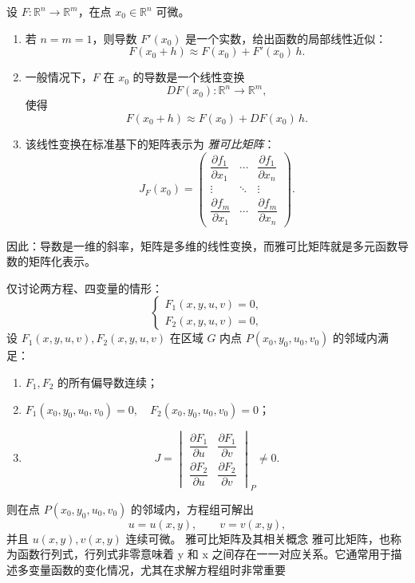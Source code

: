 \documentclass[lang=cn,10pt]{elegantbook}
\begin{document}
\begin{proposition}[导数、矩阵与雅可比矩阵的关系]
设 $F:\mathbb{R}^n \to \mathbb{R}^m$，在点 $x_0 \in \mathbb{R}^n$ 可微。

\begin{enumerate}
    \item 若 $n=m=1$，则导数 $F'(x_0)$ 是一个实数，给出函数的局部线性近似：
    \[
    F(x_0+h) \approx F(x_0) + F'(x_0)\,h.
    \]

    \item 一般情况下，$F$ 在 $x_0$ 的导数是一个线性变换
    \[
    DF(x_0):\mathbb{R}^n \to \mathbb{R}^m,
    \]
    使得
    \[
    F(x_0+h) \approx F(x_0) + DF(x_0)\,h.
    \]

    \item 该线性变换在标准基下的矩阵表示为 \emph{雅可比矩阵}：
    \[
    J_F(x_0) =
    \begin{pmatrix}
      \dfrac{\partial f_1}{\partial x_1} & \cdots & \dfrac{\partial f_1}{\partial x_n} \\
      \vdots & \ddots & \vdots \\
      \dfrac{\partial f_m}{\partial x_1} & \cdots & \dfrac{\partial f_m}{\partial x_n}
    \end{pmatrix}.
    \]
\end{enumerate}

\noindent
因此：导数是一维的斜率，矩阵是多维的线性变换，而雅可比矩阵就是多元函数导数的矩阵化表示。
\end{proposition}
\begin{proposition}[从隐函数组存在定理回忆雅可比矩阵]
仅讨论两方程、四变量的情形：
\[
\begin{cases}
F_{1}(x,y,u,v) = 0,\\
F_{2}(x,y,u,v) = 0,
\end{cases}
\]
设 $F_{1}(x,y,u,v),F_{2}(x,y,u,v)$ 在区域 $G$ 内点 
$P(x_{0},y_{0},u_{0},v_{0})$ 的邻域内满足：

\begin{enumerate}
  \item $F_{1},F_{2}$ 的所有偏导数连续；
  \item $F_{1}(x_{0},y_{0},u_{0},v_{0})=0,\quad F_{2}(x_{0},y_{0},u_{0},v_{0})=0$；
  \item
  \[
  J = 
  \begin{vmatrix}
    \dfrac{\partial F_{1}}{\partial u} & \dfrac{\partial F_{1}}{\partial v}\\[6pt]
    \dfrac{\partial F_{2}}{\partial u} & \dfrac{\partial F_{2}}{\partial v}
  \end{vmatrix}_{P} \neq 0.
  \]
\end{enumerate}

则在点 $P(x_{0},y_{0},u_{0},v_{0})$ 的邻域内，方程组可解出
\[
u = u(x,y), \qquad v = v(x,y),
\]
并且 $u(x,y), v(x,y)$ 连续可微。
雅可比矩阵及其相关概念
雅可比矩阵，也称为函数行列式，行列式非零意味着 y 和 x 之间存在一一对应关系。它通常用于描述多变量函数的变化情况，尤其在求解方程组时非常重要
\end{proposition}
\end{document}
